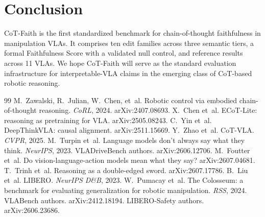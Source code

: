 \documentclass{article}
\begin{document}
\section{Conclusion}
CoT-Faith is the first standardized benchmark for chain-of-thought faithfulness in manipulation VLAs. It comprises ten edit families across three semantic tiers, a formal Faithfulness Score with a validated null control, and reference results across 11 VLAs. We hope CoT-Faith will serve as the standard evaluation infrastructure for interpretable-VLA claims in the emerging class of CoT-based robotic reasoning.


\begin{thebibliography}{99}
 M.~Zawalski, R.~Julian, W.~Chen, et~al. Robotic control via embodied chain-of-thought reasoning. \emph{CoRL}, 2024. arXiv:2407.08693.
 X.~Chen et~al. ECoT-Lite: reasoning as pretraining for VLA. arXiv:2505.08243.
 C.~Yin et~al. DeepThinkVLA: causal alignment. arXiv:2511.15669.
 Y.~Zhao et~al. CoT-VLA. \emph{CVPR}, 2025.
 M.~Turpin et~al. Language models don't always say what they think. \emph{NeurIPS}, 2023.
 VLADriveBench authors. arXiv:2606.12706.
 M.~Foutter et~al. Do vision-language-action models mean what they say? arXiv:2607.04681.
 T.~Trinh et~al. Reasoning as a double-edged sword. arXiv:2607.17786.
 B.~Liu et~al. LIBERO. \emph{NeurIPS D\&B}, 2023.
 W.~Pumacay et~al. The Colosseum: a benchmark for evaluating generalization for robotic manipulation. \emph{RSS}, 2024.
 VLABench authors. arXiv:2412.18194.
 LIBERO-Safety authors. arXiv:2606.23686.
\end{thebibliography}
\end{document}
